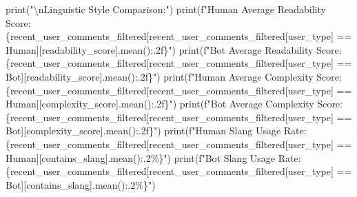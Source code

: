 \documentclass[
  12pt,
  letterpaper,
  DIV=11,
  numbers=noendperiod]{scrartcl}
\newenvironment{Shaded}{\begin{snugshade}}{\end{snugshade}}
\newcommand{\BuiltInTok}[1]{\textcolor[rgb]{0.00,0.23,0.31}{#1}}
\newcommand{\CharTok}[1]{\textcolor[rgb]{0.13,0.47,0.30}{#1}}
\newcommand{\NormalTok}[1]{\textcolor[rgb]{0.00,0.23,0.31}{#1}}
\newcommand{\OperatorTok}[1]{\textcolor[rgb]{0.37,0.37,0.37}{#1}}
\newcommand{\SpecialCharTok}[1]{\textcolor[rgb]{0.37,0.37,0.37}{#1}}
\newcommand{\SpecialStringTok}[1]{\textcolor[rgb]{0.13,0.47,0.30}{#1}}
\newcommand{\StringTok}[1]{\textcolor[rgb]{0.13,0.47,0.30}{#1}}
\begin{document}
\begin{Shaded}
\begin{Highlighting}[]
\BuiltInTok{print}\NormalTok{(}\StringTok{"}\CharTok{\textbackslash{}n}\StringTok{Linguistic Style Comparison:"}\NormalTok{)}
\BuiltInTok{print}\NormalTok{(}\SpecialStringTok{f"Human Average Readability Score: }\SpecialCharTok{\{}\NormalTok{recent\_user\_comments\_filtered[recent\_user\_comments\_filtered[}\StringTok{\textquotesingle{}user\_type\textquotesingle{}}\NormalTok{] }\OperatorTok{==} \StringTok{\textquotesingle{}Human\textquotesingle{}}\NormalTok{][}\StringTok{\textquotesingle{}readability\_score\textquotesingle{}}\NormalTok{]}\SpecialCharTok{.}\NormalTok{mean()}\SpecialCharTok{:.2f\}}\SpecialStringTok{"}\NormalTok{)}
\BuiltInTok{print}\NormalTok{(}\SpecialStringTok{f"Bot Average Readability Score: }\SpecialCharTok{\{}\NormalTok{recent\_user\_comments\_filtered[recent\_user\_comments\_filtered[}\StringTok{\textquotesingle{}user\_type\textquotesingle{}}\NormalTok{] }\OperatorTok{==} \StringTok{\textquotesingle{}Bot\textquotesingle{}}\NormalTok{][}\StringTok{\textquotesingle{}readability\_score\textquotesingle{}}\NormalTok{]}\SpecialCharTok{.}\NormalTok{mean()}\SpecialCharTok{:.2f\}}\SpecialStringTok{"}\NormalTok{)}
\BuiltInTok{print}\NormalTok{(}\SpecialStringTok{f"Human Average Complexity Score: }\SpecialCharTok{\{}\NormalTok{recent\_user\_comments\_filtered[recent\_user\_comments\_filtered[}\StringTok{\textquotesingle{}user\_type\textquotesingle{}}\NormalTok{] }\OperatorTok{==} \StringTok{\textquotesingle{}Human\textquotesingle{}}\NormalTok{][}\StringTok{\textquotesingle{}complexity\_score\textquotesingle{}}\NormalTok{]}\SpecialCharTok{.}\NormalTok{mean()}\SpecialCharTok{:.2f\}}\SpecialStringTok{"}\NormalTok{)}
\BuiltInTok{print}\NormalTok{(}\SpecialStringTok{f"Bot Average Complexity Score: }\SpecialCharTok{\{}\NormalTok{recent\_user\_comments\_filtered[recent\_user\_comments\_filtered[}\StringTok{\textquotesingle{}user\_type\textquotesingle{}}\NormalTok{] }\OperatorTok{==} \StringTok{\textquotesingle{}Bot\textquotesingle{}}\NormalTok{][}\StringTok{\textquotesingle{}complexity\_score\textquotesingle{}}\NormalTok{]}\SpecialCharTok{.}\NormalTok{mean()}\SpecialCharTok{:.2f\}}\SpecialStringTok{"}\NormalTok{)}
\BuiltInTok{print}\NormalTok{(}\SpecialStringTok{f"Human Slang Usage Rate: }\SpecialCharTok{\{}\NormalTok{recent\_user\_comments\_filtered[recent\_user\_comments\_filtered[}\StringTok{\textquotesingle{}user\_type\textquotesingle{}}\NormalTok{] }\OperatorTok{==} \StringTok{\textquotesingle{}Human\textquotesingle{}}\NormalTok{][}\StringTok{\textquotesingle{}contains\_slang\textquotesingle{}}\NormalTok{]}\SpecialCharTok{.}\NormalTok{mean()}\SpecialCharTok{:.2\%\}}\SpecialStringTok{"}\NormalTok{)}
\BuiltInTok{print}\NormalTok{(}\SpecialStringTok{f"Bot Slang Usage Rate: }\SpecialCharTok{\{}\NormalTok{recent\_user\_comments\_filtered[recent\_user\_comments\_filtered[}\StringTok{\textquotesingle{}user\_type\textquotesingle{}}\NormalTok{] }\OperatorTok{==} \StringTok{\textquotesingle{}Bot\textquotesingle{}}\NormalTok{][}\StringTok{\textquotesingle{}contains\_slang\textquotesingle{}}\NormalTok{]}\SpecialCharTok{.}\NormalTok{mean()}\SpecialCharTok{:.2\%\}}\SpecialStringTok{"}\NormalTok{)}
\end{Highlighting}
\end{Shaded}
\end{document}
